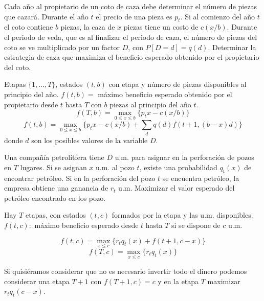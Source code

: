 \documentclass[twoside]{article}
\begin{document}
\newpage 
\begin{ejercicio}{2}
Cada año al propietario de un coto de caza debe determinar el número de piezas que cazará. Durante el año $t$ el precio de una pieza es $p_t$. Si al comienzo del año $t$ el coto contiene $b$ piezas, la caza de $x$ piezas tiene un costo de $c(x/b)$. Durante el periodo de veda, que es al finalizar el periodo de caza, el número de piezas del coto se ve multiplicado por un factor $D$, con $P[D=d]=q(d)$. Determinar la estrategia de caza que maximiza el beneficio esperado obtenido por el propietario del coto.


\begin{solucion}
Etapas $\{1,\dots, T\}$, estados $(t,b)$ con etapa y número de piezas disponibles al principio del año.
$f(t,b)=$ máximo beneficio esperado obtenido por el propietario desde $t$ hasta $T$ con $b$ piezas al principio del año $t$.
$$f(T,b)=\max_{0\leq x\leq b}\{p_tx-c(x/b)\}$$
$$f(t,b)=\max_{0\leq x\leq b}\{p_tx-c(x/b)+\sum_d q(d)f(t+1,(b-x)d)\}$$
donde $d$ son los posibles valores de la variable $D$. 
\end{solucion}

\end{ejercicio}

\newpage 
\begin{ejercicio}{3}
Una compañía petrolítfera tiene $D$ u.m. para asignar en la perforación de pozos en $T$ lugares. Si se asignan $x$ u.m. al pozo $t$, existe una probabilidad $q_t(x)$ de encontrar petróleo. Si en la perforación del pozo $t$ se encuentra petróleo, la empresa obtiene una ganancia de $r_t$ u.m. Maximizar el valor esperado del petróleo encontrado en los pozo.
\begin{solucion}
Hay $T$ etapas, con estados $(t,c)$ formados por la etapa y las u.m. disponibles. $f(t,c):$ máximo beneficio esperado desde $t$ hasta $T$ si se dispone de $c$ u.m.  

$$f(t,c)=\max_{x\leq c}\{r_tq_t(x)+f(t+1,c-x)\}$$
$$f(T,c)=\max_{x\leq c}\{r_tq_t(x)\}$$

Si quisiéramos considerar que no es necesario invertir todo el dinero podemos considerar una etapa $T+1$ con $f(T+1,c)=c$ y en la etapa $T$ maximizar $r_tq_t(c-x)$. 







\end{solucion}
\end{ejercicio}	
\end{document}
